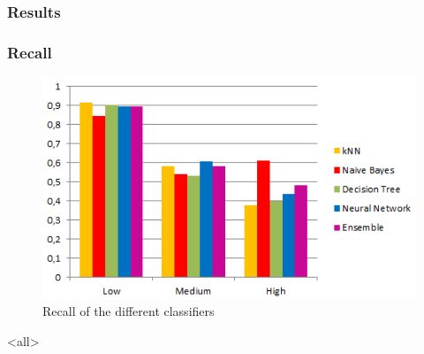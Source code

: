 \begin{frame}
        \frametitle{Results}
	\begin{table}[h]
		\centering
		\caption{Confusion matrix of the ensemble}
		\label{tab:mat-vote}
	\end{table}
\end{frame}


\begin{frame}
	\frametitle{Recall}	
	\begin{figure}[h]
		\centering
		\includegraphics[width=0.7\columnwidth]{../../charts/recall.png}
		\caption{Recall of the different classifiers}
		\label{fig:recall}
	\end{figure}
\end{frame}
\mode<all>
